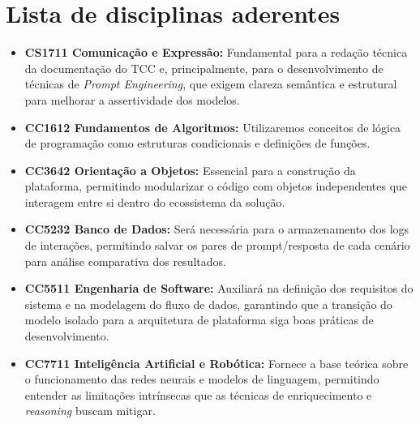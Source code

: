 \documentclass[11pt,a4,oneside]{article}
\begin{document}
\section*{Lista de disciplinas aderentes}
\begin{itemize}
    \item \textbf{CS1711 Comunicação e Expressão:} Fundamental para a redação técnica da documentação do TCC e, principalmente, para o desenvolvimento de técnicas de \textit{Prompt Engineering}, que exigem clareza semântica e estrutural para melhorar a assertividade dos modelos.
    \item \textbf{CC1612 Fundamentos de Algoritmos:} Utilizaremos conceitos de lógica de programação como estruturas condicionais e definições de funções.
    \item \textbf{CC3642 Orientação a Objetos:} Essencial para a construção da plataforma, permitindo modularizar o código com objetos independentes que interagem entre si dentro do ecossistema da solução.
    \item \textbf{CC5232 Banco de Dados:} Será necessária para o armazenamento dos logs de interações, permitindo salvar os pares de prompt/resposta de cada cenário para análise comparativa dos resultados.
    \item \textbf{CC5511 Engenharia de Software:} Auxiliará na definição dos requisitos do sistema e na modelagem do fluxo de dados, garantindo que a transição do modelo isolado para a arquitetura de plataforma siga boas práticas de desenvolvimento.
    \item \textbf{CC7711 Inteligência Artificial e Robótica:} Fornece a base teórica sobre o funcionamento das redes neurais e modelos de linguagem, permitindo entender as limitações intrínsecas que as técnicas de enriquecimento e \textit{reasoning} buscam mitigar.
\end{itemize}
\end{document}
